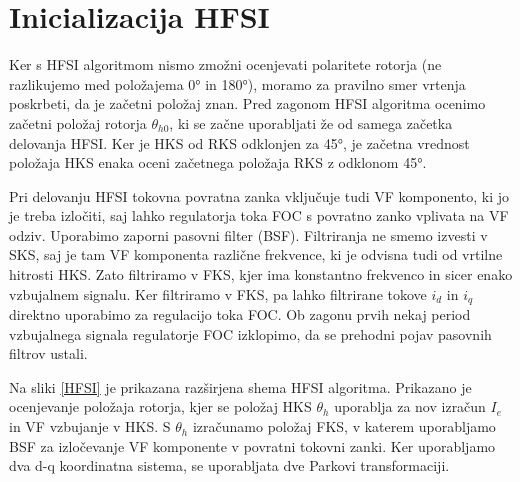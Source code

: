 \documentclass[a4paper,twoside,openright,12pt,slovene]{book}
\begin{document}
\section{Inicializacija HFSI}

Ker s HFSI algoritmom nismo zmožni ocenjevati polaritete rotorja (ne razlikujemo med položajema 0° in 180°), moramo za pravilno smer vrtenja poskrbeti, da je začetni položaj znan. Pred zagonom
HFSI algoritma ocenimo začetni položaj rotorja $\theta_{h0}$\cite{IPDBoussak}, ki se začne uporabljati že od samega začetka delovanja HFSI. Ker je HKS od RKS odklonjen za 45°, je začetna
vrednost položaja HKS enaka oceni začetnega položaja RKS z odklonom 45°.

Pri delovanju HFSI tokovna povratna zanka vključuje tudi VF komponento, ki jo je treba izločiti, saj lahko regulatorja toka FOC s povratno zanko vplivata na VF odziv. Uporabimo zaporni pasovni
filter (BSF). Filtriranja ne smemo izvesti v SKS, saj je tam VF komponenta različne frekvence, ki je odvisna tudi od vrtilne hitrosti HKS. Zato filtriramo v FKS, kjer ima konstantno frekvenco in sicer
enako vzbujalnem signalu. Ker filtriramo v FKS, pa lahko filtrirane tokove $i_d$ in $i_q$ direktno uporabimo za regulacijo toka FOC. Ob zagonu prvih nekaj period vzbujalnega signala regulatorje FOC
izklopimo, da se prehodni pojav pasovnih filtrov ustali. 

\newpage

Na sliki \ref{HFSI} je prikazana razširjena shema HFSI algoritma. Prikazano je ocenjevanje položaja rotorja, kjer se položaj HKS $\theta_h$ uporablja za nov izračun $I_e$ in VF vzbujanje v HKS. S
$\theta_h$ izračunamo položaj FKS, v katerem uporabljamo BSF za izločevanje VF komponente v povratni tokovni zanki. Ker uporabljamo dva d-q koordinatna sistema, se uporabljata dve Parkovi
transformaciji.
\end{document}
